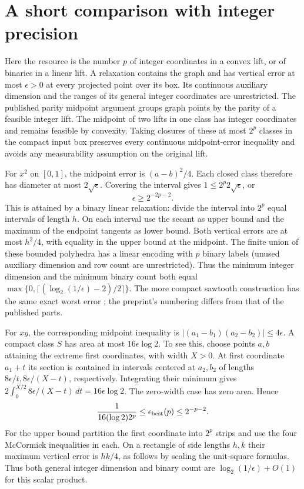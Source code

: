 \section{A short comparison with integer precision}\label{app:integer-precision}
Here the resource is the number $p$ of integer coordinates in a convex
lift, or of binaries in a linear lift. A relaxation contains the graph and
has vertical error at most $\epsilon>0$ at every projected point over its
box. Its continuous auxiliary dimension and the ranges of its general
integer coordinates are unrestricted. The published parity midpoint
argument \citep[Lemma 4.1]{LubinEtAl2022} groups graph points by the parity
of a feasible integer lift. The midpoint of two lifts in one class has
integer coordinates and remains feasible by convexity. Taking closures
of these at most $2^p$ classes in the compact input box preserves every
continuous midpoint-error inequality and avoids any measurability
assumption on the original lift.

For $x^2$ on $[0,1]$, the midpoint error is $(a-b)^2/4$. Each closed class
therefore has diameter at most $2\sqrt\epsilon$. Covering the interval
gives $1\le2^p2\sqrt\epsilon$, or
\begin{equation}\label{eq:integer-square}
 \epsilon\ge2^{-2p-2}.
\end{equation}
This is attained by a binary linear relaxation: divide the interval into
$2^p$ equal intervals of length $h$. On each interval use the secant as
upper bound and the maximum of the endpoint tangents as lower bound.
Both vertical errors are at most $h^2/4$, with equality in the upper
bound at the midpoint. The finite union of these bounded polyhedra has
a linear encoding with $p$ binary labels (unused auxiliary dimension and
row count are unrestricted). Thus the minimum integer dimension and the
minimum binary count both equal
$\max\{0,\lceil(\log_2(1/\epsilon)-2)/2\rceil\}$.
The more compact sawtooth construction has the same exact worst error
\citep[combined 2022 preprint, Section 5.1.1, PDF p.\ 21]{BeachEtAl2024};
the preprint's numbering differs from that of the published parts.

For $xy$, the corresponding midpoint inequality is
$|(a_1-b_1)(a_2-b_2)|\le4\epsilon$.
A compact class $S$ has area at most $16\epsilon\log2$. To see this,
choose points $a,b$ attaining the extreme first coordinates, with width
$X>0$.
At first coordinate $a_1+t$ its section is contained in intervals centered
at $a_2,b_2$ of lengths $8\epsilon/t,8\epsilon/(X-t)$, respectively.
Integrating their minimum gives
$2\int_0^{X/2}8\epsilon/(X-t)\,dt=16\epsilon\log2$.
The zero-width case has zero area. Hence
\begin{equation}\label{eq:integer-product}
 \frac{1}{16(\log2)2^p}\le\epsilon_{\rm best}(p)
 \le2^{-p-2}.
\end{equation}
For the upper bound partition the first coordinate into $2^p$ strips
and use the four McCormick inequalities in each. On a rectangle of side
lengths $h,k$ their maximum vertical error is $hk/4$, as follows by
scaling the unit-square formulas. Thus both general integer dimension
and binary count are $\log_2(1/\epsilon)+O(1)$ for this scalar product.

